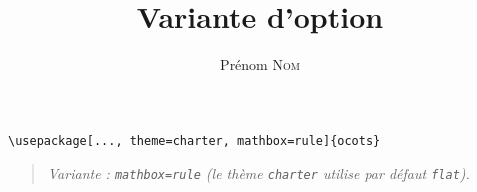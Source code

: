 \documentclass[11pt]{ocots-book}
\title{Variante d'option}
\author{Prénom \textsc{Nom}}
\newcommand{\ocotsvariantnote}[1]{\begin{quote}\itshape Variante : #1\end{quote}}
\begin{document}
\maketitle

\begin{lstlisting}
\usepackage[..., theme=charter, mathbox=rule]{ocots}
\end{lstlisting}
\ocotsvariantnote{\texttt{mathbox=rule} (le th\`eme \texttt{charter} utilise par d\'efaut \texttt{flat}).}

\end{document}
